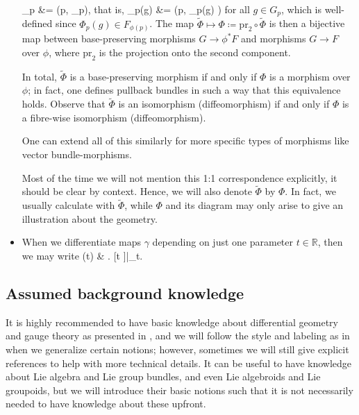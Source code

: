 \documentclass[a4paper,oneside,11pt,bibliography=totoc]{scrartcl}
\def\bas#1\eas{\begin{align*}#1\end{align*}}
\theoremstyle{plain}
\theoremstyle{remark}
\theoremstyle{definition}
\begin{document}
\begin{itemize}
\bas
\widetilde{\Phi}_p
&=
(p, \Phi_p),
\eas
that is,
\bas
\widetilde{\Phi}_p(g)
&=
\bigl(p, \Phi_p(g) \bigr)
\eas
for all $g \in G_p$, which is well-defined since $\Phi_p(g) \in F_{\phi(p)}$. The map $\widetilde{\Phi} \mapsto \Phi \coloneqq \mathrm{pr}_2 \circ \widetilde{\Phi}$ is then a bijective map between base-preserving morphisms $G \to \phi^*F$ and morphisms $G \to F$ over $\phi$, where $\mathrm{pr}_2$ is the projection onto the second component. 

In total, $\widetilde{\Phi}$ is a base-preserving morphism if and only if $\Phi$ is a morphism over $\phi$; in fact, one defines pullback bundles in such a way that this equivalence holds. Observe that $\widetilde{\Phi}$ is an isomorphism (diffeomorphism) if and only if $\Phi$ is a fibre-wise isomorphism (diffeomorphism).

One can extend all of this similarly for more specific types of morphisms like vector bundle-morphisms.

Most of the time we will not mention this 1:1 correspondence explicitly, it should be clear by context. Hence, we will also denote $\widetilde{\Phi}$ by $\Phi$. In fact, we usually calculate with $\widetilde{\Phi}$, while $\Phi$ and its diagram may only arise to give an illustration about the geometry.

\item When we differentiate maps $\gamma$ depending on just one parameter $t \in \mathbb{R}$, then we may write
\bas
\frac{\mathrm{d}}{\mathrm{d}t} \gamma(t)
&\coloneqq
\mleft. [t \mapsto \gamma]\mright|_t.
\eas
\end{itemize}

\subsection{Assumed background knowledge}

It is highly recommended to have basic knowledge about differential geometry and gauge theory as presented in \cite[especially Chapter 1 to 5]{Hamilton}, and we will follow the style and labeling as in \cite{Hamilton} when we generalize certain notions; however, sometimes we will still give explicit references to help with more technical details. It can be useful to have knowledge about Lie algebra and Lie group bundles, and even Lie algebroids and Lie groupoids, but we will introduce their basic notions such that it is not necessarily needed to have knowledge about these upfront.
\end{document}
